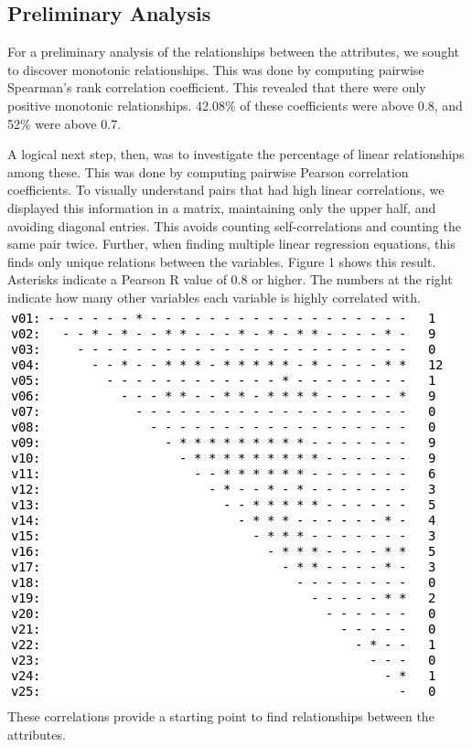 \documentclass[12pt,a4paper,twocolumn]{article}
\begin{document}
	\subsection{Preliminary Analysis}
	For a preliminary analysis of the relationships between the attributes, we sought to discover monotonic relationships. This was done by computing pairwise Spearman's rank correlation coefficient. This revealed that there were only positive monotonic relationships. 42.08\% of these coefficients were above 0.8, and 52\% were above 0.7.
	
	A logical next step, then, was to investigate the percentage of linear relationships among these. This was done by computing pairwise Pearson correlation coefficients. To visually understand pairs that had high linear correlations, we displayed this information in a matrix, maintaining only the upper half, and avoiding diagonal entries. This avoids counting self-correlations and counting the same pair twice. Further, when finding multiple linear regression equations, this finds only unique relations between the variables. Figure 1 shows this result. Asterisks indicate a Pearson R value of 0.8 or higher. The numbers at the right indicate how many other variables each variable is highly correlated with. \\
	
	\includegraphics[scale=0.4]{fig1.png}
	\begingroup
	\endgroup
	\hfill\break
	These correlations provide a starting point to find relationships between the attributes.
	
\end{document}
